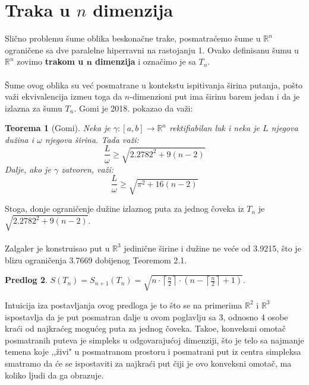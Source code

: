 \documentclass[11pt,letter]{article}
\newtheorem{teo}{\bf Teorema}[section]
\newtheorem{pred}[teo]{\bf Predlog}
\begin{document}
\section[Traka u $n$ dimenzija]{Traka u $n$ dimenzija}
\bigskip
 Sli\v cno problemu \v sume oblika beskona\v cne trake, posmatra\' cemo \v sume u $\mathbb{R}^n$ ograni\v cene sa dve paralelne hiperravni na rastojanju 1. Ovako definisanu \v sumu u $\mathbb{R}^n$ zovimo \textbf{trakom u $\textbf{n}$ dimenzija} i ozna\v cimo je sa $T_n$.
\\
\\
\indent \v Sume ovog oblika su ve\' c posmatrane u kontekstu ispitivanja \v sirina putanja, po\v sto va\v zi ekvivalencija izme\dj u toga da $n$-dimenzioni put ima \v sirinu barem jedan i da je izlazna za \v sumu $T_n$. Gomi \cite{Ghomi} je 2018. pokazao da va\v zi:
\smallskip
\begin{teo}[Gomi] 
Neka je $\gamma: [a,b]\to \mathbb{R}^n$ rektifiabilan luk i neka je $L$ njegova du\v zina i $\omega$ njegova \v sirina. Tada va\v zi:
$$\frac{L}{\omega}\geqslant \sqrt{2.2782^2+9(n-2)}$$
Dalje, ako je $\gamma$ zatvoren, va\v zi:
$$\frac{L}{\omega}\geqslant \sqrt{\pi^2+16(n-2)}$$
\end{teo}
\bigskip

\indent Stoga, donje ograni\v cenje du\v zine izlaznog puta za jednog \v coveka iz $T_n$ je $ \sqrt{2.2782^2+9(n-2)}$.
\\
\\
Zalgaler \cite{Zalgaller3d} je konstruisao put u $\mathbb{R}^3$ jedini\v cne \v sirine i du\v zine ne ve\' ce od 3.9215, \v sto je blizu ograni\v cenja 3.7669 dobijenog Teoremom 2.1.
\\
\begin{pred} $S(T_n)=S_{n+1}(T_n)=\sqrt{n\cdot\left\lceil\frac{n}{2}\right\rceil\cdot\left( n-\left\lceil\frac{n}{2}\right\rceil+1\right)}$.\end{pred}
\smallskip

\indent Intuicija iza postavljanja ovog predloga je to \v sto se na primerima $\mathbb{R}^2$ i $\mathbb{R}^3$ ispostavlja da je put posmatran dalje u ovom poglavlju sa 3, odnosno 4 osobe kra\' ci od najkra\' ceg mogu\' ceg puta za jednog \v coveka. Tako\dj e, konveksni omota\v c posmatranih puteva je simpleks u odgovaraju\' coj dimenziji, \v sto je telo sa najmanje temena koje ,,\v zivi" u posmatranom prostoru i posmatrani put iz centra simpleksa smatramo da \' ce se ispostaviti za najkra\' ci put \v ciji je ovo konveksni omota\v c, ma koliko ljudi da ga obrazuje.
\end{document}
